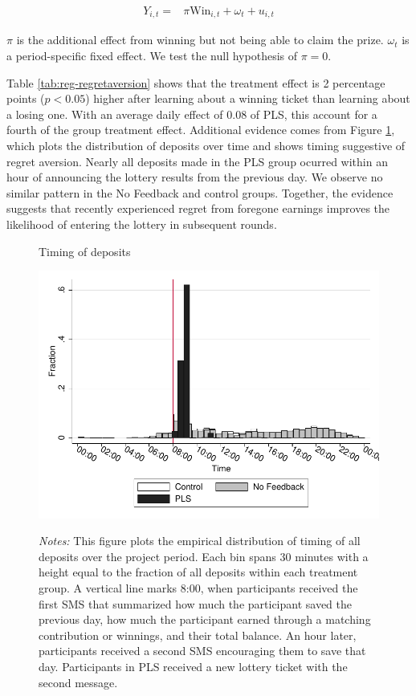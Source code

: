 \documentclass[11pt]{article}
\begin{document}
		\begin{equation} \begin{split}
		Y_{i,t} = & \pi \text{Win}_{i,t} + \omega_{t} + u_{i,t}
		\end{split} \label{eq:regret} \end{equation}

		$\pi$ is the additional effect from winning but not being able to claim the prize. $\omega_{t}$ is a period-specific fixed effect. We test the null hypothesis of $\pi = 0$.

		

		Table \ref{tab:reg-regretaversion} shows that the treatment effect is 2 percentage points ($p<0.05$) higher after learning about a winning ticket than learning about a losing one. With an average daily effect of 0.08 of PLS, this account for a fourth of the group treatment effect. Additional evidence comes from Figure \ref{fig:hist-deposits}, which plots the distribution of deposits over time and shows timing suggestive of regret aversion. Nearly all deposits made in the PLS group ocurred within an hour of announcing the lottery results from the previous day. We observe no similar pattern in the No Feedback and control groups. Together, the evidence suggests that recently experienced regret from foregone earnings improves the likelihood of entering the lottery in subsequent rounds.

		\begin{figure}[ht]
		\centering
		\caption{Timing of deposits}
		\includegraphics[width=\textwidth]{../../figures/hist-deposits.pdf}
		\label{fig:hist-deposits}
		\caption*{\footnotesize \emph{Notes:} This figure plots the empirical distribution of timing of all deposits over the project period. Each bin spans 30 minutes with a height equal to the fraction of all deposits within each treatment group. A vertical line marks 8:00, when participants received the first SMS that summarized how much the participant saved the previous day, how much the participant earned through a matching contribution or winnings, and their total balance. An hour later, participants received a second SMS encouraging them to save that day. Participants in PLS received a new lottery ticket with the second message.}
		\end{figure}
\end{document}
